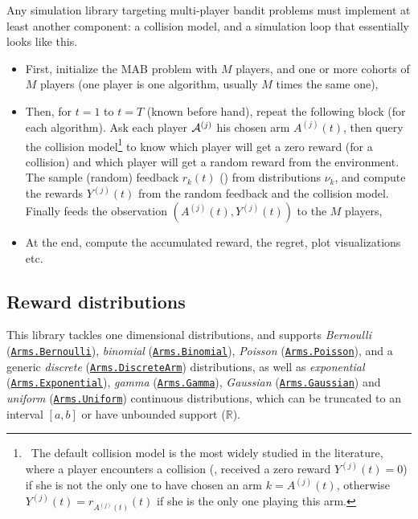 Any simulation library targeting multi-player bandit problems must implement at least another component:
a collision model, and a simulation loop that essentially looks like this.
\begin{itemize}
    \item First, initialize the MAB problem with $M$ players, and one or more cohorts of $M$ players (one player is one algorithm, usually $M$ times the same one),
    \item Then, for $t=1$ to $t=T$ (known before hand), repeat the following block (for each algorithm). Ask each player $\mathcal{A}^{(j)}$ his chosen arm $A^{(j)}(t)$, then query the collision model\footnote{~The default collision model is the most widely studied in the literature, where a player encounters a collision (\ie, received a zero reward $Y^{(j)}(t)=0$) if she is not the only one to have chosen an arm $k=A^{(j)}(t)$, otherwise $Y^{(j)}(t)=r_{A^{(j)}(t)}(t)$ if she is the only one playing this arm.} to know which player will get a zero reward (for a collision) and which player will get a random reward from the environment. The
    sample (random) feedback $r_k(t)$ (\iid) from distributions $\nu_{k}$, and compute the rewards $Y^{(j)}(t)$ from the random feedback and the collision model. Finally feeds the observation $(A^{(j)}(t),Y^{(j)}(t))$ to the $M$ players,
    \item At the end, compute the accumulated reward, the regret, plot visualizations etc.
\end{itemize}


\subsection{Reward distributions}
%
This library tackles one dimensional distributions,
and supports \emph{Bernoulli} (\texttt{\href{https://smpybandits.github.io/docs/Arms.Bernoulli.html}{Arms.Bernoulli}}), \emph{binomial} (\texttt{\href{https://smpybandits.github.io/docs/Arms.Binomial.html}{Arms.Binomial}}), \emph{Poisson} (\texttt{\href{https://smpybandits.github.io/docs/Arms.Poisson.html}{Arms.Poisson}}), and a generic \emph{discrete} (\texttt{\href{https://smpybandits.github.io/docs/Arms.DiscreteArm.html}{Arms.DiscreteArm}}) distributions,
as well as \emph{exponential} (\texttt{\href{https://smpybandits.github.io/docs/Arms.Exponential.html}{Arms.Exponential}}), \emph{gamma} (\texttt{\href{https://smpybandits.github.io/docs/Arms.Gamma.html}{Arms.Gamma}}), \emph{Gaussian} (\texttt{\href{https://smpybandits.github.io/docs/Arms.Gaussian.html}{Arms.Gaussian}}) and \emph{uniform} (\texttt{\href{https://smpybandits.github.io/docs/Arms.Uniform.html}{Arms.Uniform}}) continuous distributions,
which can be truncated to an interval $[a,b]$ or have unbounded support ($\mathbb{R}$).

